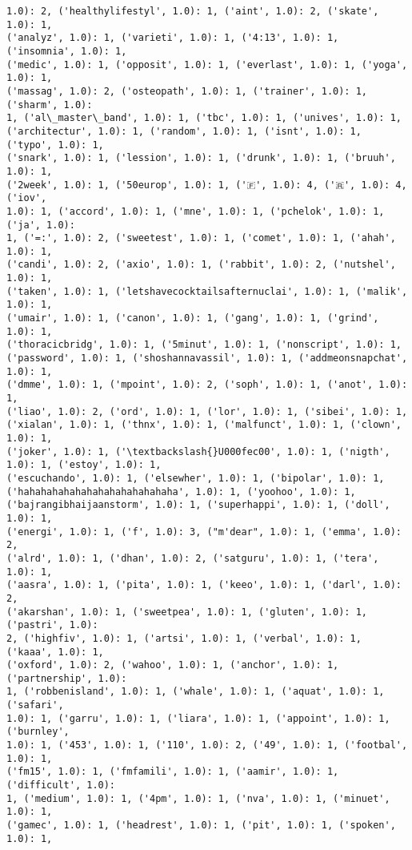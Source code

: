 \documentclass[11pt]{article}
\begin{document}
\begin{Verbatim}[commandchars=\\\{\}]
1.0): 2, ('healthylifestyl', 1.0): 1, ('aint', 1.0): 2, ('skate', 1.0): 1,
('analyz', 1.0): 1, ('varieti', 1.0): 1, ('4:13', 1.0): 1, ('insomnia', 1.0): 1,
('medic', 1.0): 1, ('opposit', 1.0): 1, ('everlast', 1.0): 1, ('yoga', 1.0): 1,
('massag', 1.0): 2, ('osteopath', 1.0): 1, ('trainer', 1.0): 1, ('sharm', 1.0):
1, ('al\_master\_band', 1.0): 1, ('tbc', 1.0): 1, ('unives', 1.0): 1,
('architectur', 1.0): 1, ('random', 1.0): 1, ('isnt', 1.0): 1, ('typo', 1.0): 1,
('snark', 1.0): 1, ('lession', 1.0): 1, ('drunk', 1.0): 1, ('bruuh', 1.0): 1,
('2week', 1.0): 1, ('50europ', 1.0): 1, ('🇫', 1.0): 4, ('🇷', 1.0): 4, ('iov',
1.0): 1, ('accord', 1.0): 1, ('mne', 1.0): 1, ('pchelok', 1.0): 1, ('ja', 1.0):
1, ('=:', 1.0): 2, ('sweetest', 1.0): 1, ('comet', 1.0): 1, ('ahah', 1.0): 1,
('candi', 1.0): 2, ('axio', 1.0): 1, ('rabbit', 1.0): 2, ('nutshel', 1.0): 1,
('taken', 1.0): 1, ('letshavecocktailsafternuclai', 1.0): 1, ('malik', 1.0): 1,
('umair', 1.0): 1, ('canon', 1.0): 1, ('gang', 1.0): 1, ('grind', 1.0): 1,
('thoracicbridg', 1.0): 1, ('5minut', 1.0): 1, ('nonscript', 1.0): 1,
('password', 1.0): 1, ('shoshannavassil', 1.0): 1, ('addmeonsnapchat', 1.0): 1,
('dmme', 1.0): 1, ('mpoint', 1.0): 2, ('soph', 1.0): 1, ('anot', 1.0): 1,
('liao', 1.0): 2, ('ord', 1.0): 1, ('lor', 1.0): 1, ('sibei', 1.0): 1,
('xialan', 1.0): 1, ('thnx', 1.0): 1, ('malfunct', 1.0): 1, ('clown', 1.0): 1,
('joker', 1.0): 1, ('\textbackslash{}U000fec00', 1.0): 1, ('nigth', 1.0): 1, ('estoy', 1.0): 1,
('escuchando', 1.0): 1, ('elsewher', 1.0): 1, ('bipolar', 1.0): 1,
('hahahahahahahahahahahahahaha', 1.0): 1, ('yoohoo', 1.0): 1,
('bajrangibhaijaanstorm', 1.0): 1, ('superhappi', 1.0): 1, ('doll', 1.0): 1,
('energi', 1.0): 1, ('f', 1.0): 3, ("m'dear", 1.0): 1, ('emma', 1.0): 2,
('alrd', 1.0): 1, ('dhan', 1.0): 2, ('satguru', 1.0): 1, ('tera', 1.0): 1,
('aasra', 1.0): 1, ('pita', 1.0): 1, ('keeo', 1.0): 1, ('darl', 1.0): 2,
('akarshan', 1.0): 1, ('sweetpea', 1.0): 1, ('gluten', 1.0): 1, ('pastri', 1.0):
2, ('highfiv', 1.0): 1, ('artsi', 1.0): 1, ('verbal', 1.0): 1, ('kaaa', 1.0): 1,
('oxford', 1.0): 2, ('wahoo', 1.0): 1, ('anchor', 1.0): 1, ('partnership', 1.0):
1, ('robbenisland', 1.0): 1, ('whale', 1.0): 1, ('aquat', 1.0): 1, ('safari',
1.0): 1, ('garru', 1.0): 1, ('liara', 1.0): 1, ('appoint', 1.0): 1, ('burnley',
1.0): 1, ('453', 1.0): 1, ('110', 1.0): 2, ('49', 1.0): 1, ('footbal', 1.0): 1,
('fm15', 1.0): 1, ('fmfamili', 1.0): 1, ('aamir', 1.0): 1, ('difficult', 1.0):
1, ('medium', 1.0): 1, ('4pm', 1.0): 1, ('nva', 1.0): 1, ('minuet', 1.0): 1,
('gamec', 1.0): 1, ('headrest', 1.0): 1, ('pit', 1.0): 1, ('spoken', 1.0): 1,

\end{Verbatim}
\end{document}
